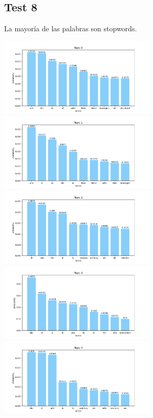 \documentclass[10pt]{article} %
\begin{document}
	\subsection{Test 8}
	La mayor\'ia de las palabras son stopwords.
	
	\begin{center}
		\includegraphics[width=7.5cm]{images/plots/test_8/topic_0.png}
		\includegraphics[width=7.5cm]{images/plots/test_8/topic_1.png}
		\includegraphics[width=7.5cm]{images/plots/test_8/topic_2.png}
		\includegraphics[width=7.5cm]{images/plots/test_8/topic_3.png}
		\includegraphics[width=7.5cm]{images/plots/test_8/topic_4.png}

\end{center}
\end{document}
